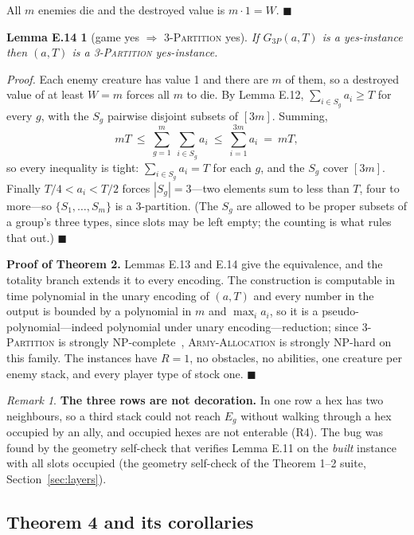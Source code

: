 \documentclass[11pt,a4paper]{article}
\theoremstyle{plain}
\newtheorem*{lemEnotwo}{Lemma E.14}
\theoremstyle{definition}
\theoremstyle{plain}
\theoremstyle{definition}
\theoremstyle{remark}
\newtheorem*{remark}{Remark}
\newcommand{\ALLOC}{\textsc{Army-Allocation}}
\newcommand{\THREEPART}{\textsc{3-Partition}}
\newcommand{\qedbox}{\hfill$\blacksquare$}
\begin{document}
All $m$ enemies die and the destroyed value is $m\cdot 1=W$. \qedbox

\begin{lemEnotwo}[game yes $\Longrightarrow$ \THREEPART{} yes]
If $G_{3P}(a,T)$ is a yes-instance then $(a,T)$ is a \THREEPART{} yes-instance.
\end{lemEnotwo}

\noindent\emph{Proof.} Each enemy creature has value 1 and there are $m$ of them, so a
destroyed value of at least $W=m$ forces all $m$ to die. By Lemma E.12,
$\sum_{i\in S_g}a_i\ge T$ for every $g$, with the $S_g$ pairwise disjoint subsets of $[3m]$.
Summing,
\[
  mT\ \le\ \sum_{g=1}^{m}\ \sum_{i\in S_g}a_i\ \le\ \sum_{i=1}^{3m}a_i\ =\ mT ,
\]
so every inequality is tight: $\sum_{i\in S_g}a_i=T$ for each $g$, and the $S_g$ cover
$[3m]$. Finally $T/4<a_i<T/2$ forces $|S_g|=3$---two elements sum to less than $T$, four to
more---so $\{S_1,\dots,S_m\}$ is a 3-partition. (The $S_g$ are allowed to be proper subsets
of a group's three types, since slots may be left empty; the counting is what rules that
out.) \qedbox

\smallskip
\noindent\textbf{Proof of Theorem 2.} Lemmas E.13 and E.14 give the equivalence, and the
totality branch extends it to every encoding. The construction is computable in time
polynomial in the unary encoding of $(a,T)$ and every number in the output is bounded by a
polynomial in $m$ and $\max_i a_i$, so it is a pseudo-polynomial---indeed polynomial under
unary encoding---reduction; since \THREEPART{} is strongly NP-complete~\cite{GJ79}, \ALLOC{}
is strongly NP-hard on this family. The instances have $R=1$, no obstacles, no abilities, one
creature per enemy stack, and every player type of stock one. \qedbox

\begin{remark}
\textbf{The three rows are not decoration.} In one row a hex has two neighbours, so a third
stack could not reach $E_g$ without walking through a hex occupied by an ally, and occupied
hexes are not enterable (R4). The bug was found by the geometry self-check that verifies
Lemma E.11 on the \emph{built} instance with all slots occupied (the geometry self-check of
the Theorem 1--2 suite, Section~\ref{sec:layers}).
\end{remark}

\subsection*{Theorem 4 and its corollaries}
\end{document}
